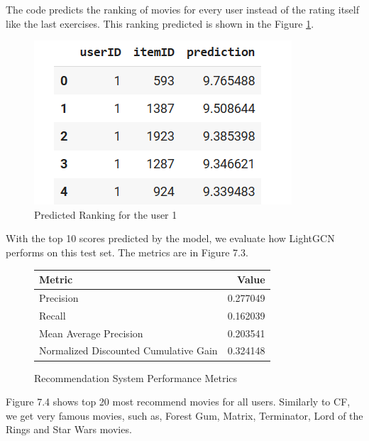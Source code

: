\documentclass[12pt]{article}
\numberwithin{equation}{section}
\begin{document}
The code predicts the ranking of movies for every user instead of the rating itself like the last exercises. This ranking predicted is shown in the Figure \ref{fig:predictions}. 

\begin{figure}[h]
		\centering
	\includegraphics{predictions.png}
	\caption{Predicted Ranking for the user 1}
	\label{fig:predictions}
\end{figure}

With the top 10 scores predicted by the model, we evaluate how LightGCN performs on this test set. The metrics are in Figure 7.3.

\begin{figure}[!ht]
    \centering  %
    \begin{tabular}{|l|r|}
        \hline
        \textbf{Metric} & \textbf{Value} \\
        \hline
        Precision & 0.277049 \\
        Recall & 0.162039 \\
        Mean Average Precision  & 0.203541 \\
        Normalized Discounted Cumulative Gain & 0.324148 \\
        \hline
    \end{tabular}
    \caption{Recommendation System Performance Metrics} %
\end{figure} 

Figure 7.4 shows top 20 most recommend movies for all users. Similarly to CF, we get very famous movies, such as, Forest Gum, Matrix, Terminator, Lord of the Rings and Star Wars movies. 
\end{document}
